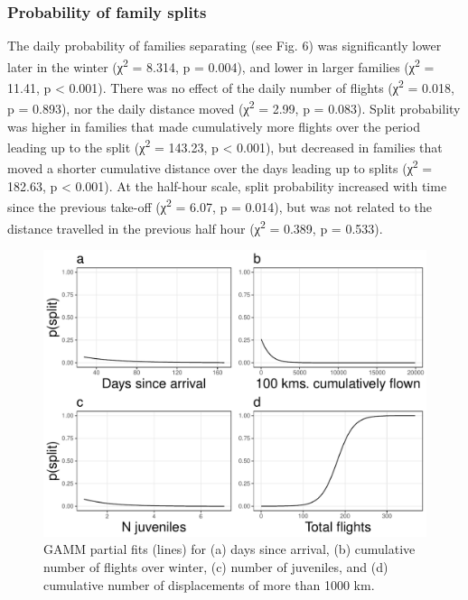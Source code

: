 \documentclass[10pt,twocolumn]{paper}
\begin{document}
\subsubsection{Probability of family
splits}\label{probability-of-family-splits}

The daily probability of families separating (see Fig. 6) was
significantly lower later in the winter (χ\textsuperscript{2} = 8.314, p
= 0.004), and lower in larger families (χ\textsuperscript{2} = 11.41, p
\textless{} 0.001). There was no effect of the daily number of flights
(χ\textsuperscript{2} = 0.018, p = 0.893), nor the daily distance moved
(χ\textsuperscript{2} = 2.99, p = 0.083). Split probability was higher
in families that made cumulatively more flights over the period leading
up to the split (χ\textsuperscript{2} = 143.23, p \textless{} 0.001),
but decreased in families that moved a shorter cumulative distance over
the days leading up to splits (χ\textsuperscript{2} = 182.63, p
\textless{} 0.001). At the half-hour scale, split probability increased
with time since the previous take-off (χ\textsuperscript{2} = 6.07, p =
0.014), but was not related to the distance travelled in the previous
half hour (χ\textsuperscript{2} = 0.389, p = 0.533).

\begin{figure}
\includegraphics[width = 1\linewidth]{split_dayprob.pdf}
\caption{{\small GAMM partial fits (lines) for (a) days since arrival, (b) cumulative number of flights over winter, (c) number of juveniles, and (d) cumulative number of displacements of more than 1000 km.}}
\end{figure}
\end{document}
